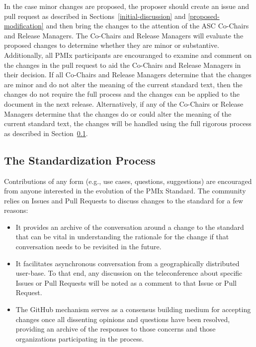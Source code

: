 \documentclass{article}
\begin{document}
In the case minor changes are proposed, the proposer should 
create an issue and pull request as described in Sections~\ref{initial-discussion}
and \ref{proposed-modification} and then bring the
changes to the attention of the ASC Co-Chairs and Release Managers.
The Co-Chairs and Release Managers will evaluate the proposed
changes to determine whether they are minor or substantive.
Additionally, all PMIx participants are encouranged to examine
and comment on the changes in the pull request to aid the
Co-Chairs and Release Managers in their decision.
If all Co-Chairs and Release Managers determine that the
changes are minor and do not alter the meaning of the current standard text, 
then the changes do not require the full process and
the changes can be applied to the document in the next release.
Alternatively, if any of the Co-Chairs or Release Managers determine 
that the changes do or could alter the meaning of the current standard text, 
the changes will be handled using the full rigorous process
as described in Section~\ref{the-standardization-process}.

\hypertarget{the-standardization-process}{%
\subsection{The Standardization Process}%
\label{the-standardization-process}}

Contributions of any form (e.g., use cases, questions, suggestions) are
encouraged from anyone interested in the evolution of the PMIx Standard.
The community relies on Issues and Pull Requests to discuss changes to
the standard for a few reasons:

\begin{itemize}
\item
  It provides an archive of the conversation around a change to the
  standard that can be vital in understanding the rationale for the
  change if that conversation needs to be revisited in the future.
\item
  It facilitates asynchronous conversation from a geographically
  distributed user-base. To that end, any discussion on the
  teleconference about specific Issues or Pull Requests will be noted as
  a comment to that Issue or Pull Request.
\item
  The GitHub mechanism serves as a consensus building medium for
  accepting changes once all dissenting opinions and questions have been
  resolved, providing an archive of the responses to those concerns and
  those organizations participating in the process.
\end{itemize}
\end{document}
